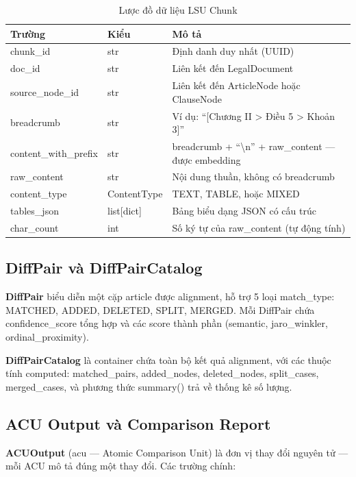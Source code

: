 \begin{table}[H]
    \centering
    \caption{Lược đồ dữ liệu LSU Chunk}
    \label{tab:lsu_chunk_schema}
    \begin{tabularx}{\textwidth}{l l X}
        \toprule
        \textbf{Trường} & \textbf{Kiểu} & \textbf{Mô tả}\\
        \midrule
        chunk\_id & str & Định danh duy nhất (UUID)\\
        doc\_id & str & Liên kết đến LegalDocument\\
        source\_node\_id & str & Liên kết đến ArticleNode hoặc ClauseNode\\
        breadcrumb & str & Ví dụ: ``[Chương II > Điều 5 > Khoản 3]''\\
        content\_with\_prefix & str & breadcrumb + ``\textbackslash n'' + raw\_content — được embedding\\
        raw\_content & str & Nội dung thuần, không có breadcrumb\\
        content\_type & ContentType & TEXT, TABLE, hoặc MIXED\\
        tables\_json & list[dict] & Bảng biểu dạng JSON có cấu trúc\\
        char\_count & int & Số ký tự của raw\_content (tự động tính)\\
        \bottomrule
    \end{tabularx}
\end{table}

\subsection{DiffPair và DiffPairCatalog}

\textbf{DiffPair} biểu diễn một cặp article được alignment, hỗ trợ 5 loại match\_type: MATCHED, ADDED, DELETED, SPLIT, MERGED. Mỗi DiffPair chứa confidence\_score tổng hợp và các score thành phần (semantic, jaro\_winkler, ordinal\_proximity).

\textbf{DiffPairCatalog} là container chứa toàn bộ kết quả alignment, với các thuộc tính computed: matched\_pairs, added\_nodes, deleted\_nodes, split\_cases, merged\_cases, và phương thức summary() trả về thống kê số lượng.

\subsection{ACU Output và Comparison Report}

\textbf{ACUOutput} (\gls{acu} — Atomic Comparison Unit) là đơn vị thay đổi nguyên tử — mỗi ACU mô tả đúng một thay đổi. Các trường chính:

